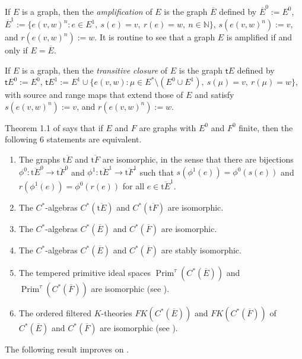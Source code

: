 \documentclass[12pt, a4paper]{amsart}
\numberwithin{equation}{section}
\theoremstyle{definition}
\theoremstyle{remark}
\begin{document}
If $E$ is a graph, then the \emph{amplification} of $E$ is the graph $\overline{E}$ defined by $\overline{E}^0:=E^0$, $\overline{E}^1:=\{e(v,w)^n:e\in E^1,\ s(e)=v,\ r(e)=w,\ n\in{\mathbb{N}}\}$, $s(e(v,w)^n):=v$, and $r(e(v,w)^n):=w$. It is routine to see that a graph $E$ is amplified if and only if $E=\overline{E}$. 

If $E$ is a graph, then the \emph{transitive closure} of $E$ is the graph $\mathsf{t}E$ defined by $\mathsf{t}E^0:=E^0$, $\mathsf{t}E^1:=E^1\cup\{e(v,w):\mu\in E^*\setminus (E^0\cup E^1),\ s(\mu)=v,\ r(\mu)=w\}$, with source and range maps that extend those of $E$ and satisfy $s(e(v,w)^n):=v$, and $r(e(v,w)^n):=w$.

Theorem 1.1 of \cite{ERS} says that if $E$ and $F$ are graphs with $E^0$ and $F^0$ finite, then the following 6 statements are equivalent.
	\begin{enumerate}
		\item The graphs ${\overline{\mathrm{t}{E}}}$ and ${\overline{\mathrm{t}{F}}}$ are isomorphic, in the sense 
		that there are bijections $\phi^0:{\overline{\mathrm{t}{E}}}^0\to {\overline{\mathrm{t}{F}}}^0$ and 
		$\phi^1:{\overline{\mathrm{t}{E}}}^1\to {\overline{\mathrm{t}{F}}}^1$ such that $s(\phi^1(e))=\phi^0(s(e))$ 
		and $r(\phi^1(e))=\phi^0(r(e))$ for all $e\in {\overline{\mathrm{t}{E}}}^1$.
		\item The $C^*$-algebras $C^*({\overline{\mathrm{t}{E}}})$ and $C^*({\overline{\mathrm{t}{F}}})$ are isomorphic.
		\item The $C^*$-algebras $C^*(\overline{E})$ and $C^*(\overline{F})$ are isomorphic.
		\item The $C^*$-algebras $C^*(\overline{E})$ and $C^*(\overline{F})$ are stably isomorphic.
		\item The tempered primitive ideal spaces ${\operatorname{Prim}^\tau}(C^*(\overline{E}))$ and ${\operatorname{Prim}^\tau}(C^*(\overline{F}))$ are isomorphic (see \cite[Definition 4.8]{ERS}).
		\item The ordered filtered $K$-theories $FK(C^*(\overline{E}))$ and $FK(C^*(\overline{F}))$ of $C^*(\overline{E})$ and $C^*(\overline{F})$ are isomorphic (see \cite[Definition 4.4]{ERS}).
	\end{enumerate}

The following result improves on \cite[Theorem~1.1]{ERS}.
\end{document}
